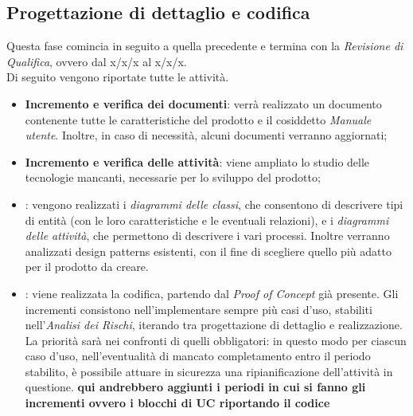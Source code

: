 \subsection{Progettazione di dettaglio e codifica}
Questa fase comincia in seguito a quella precedente e termina con la \textit{Revisione di Qualifica}, ovvero dal x/x/x al x/x/x.\\
Di seguito vengono riportate tutte le attività.

\begin{itemize}
	\item \textbf{Incremento e verifica dei documenti}: verrà realizzato un documento contenente tutte le caratteristiche del prodotto e il cosiddetto \textit{Manuale utente}. Inoltre, in caso di necessità, alcuni documenti verranno aggiornati;
	\item \textbf{Incremento e verifica delle attività}: viene ampliato lo studio delle tecnologie mancanti, necessarie per lo sviluppo del prodotto; 
	\item \textbf{}: vengono realizzati i \textit{diagrammi delle classi}, che consentono di descrivere tipi di entità (con le loro caratteristiche e le eventuali relazioni), e i \textit{diagrammi delle attività}, che permettono di descrivere i vari processi. Inoltre verranno analizzati design patterns esistenti, con il fine di scegliere quello più adatto per il prodotto da creare.
	\item \textbf{}: viene realizzata la codifica, partendo dal \textit{Proof of Concept} già presente. Gli incrementi consistono nell'implementare sempre più casi d'uso, stabiliti nell'\textit{Analisi dei Rischi}, iterando tra progettazione di dettaglio e realizzazione. La priorità sarà nei confronti di quelli obbligatori: in questo modo per ciascun caso d'uso, nell'eventualità di mancato completamento entro il periodo stabilito, è possibile attuare in sicurezza una ripianificazione dell'attività in questione. \textbf{qui andrebbero aggiunti i periodi in cui si fanno gli incrementi ovvero i blocchi di UC riportando il codice}
\end{itemize}

